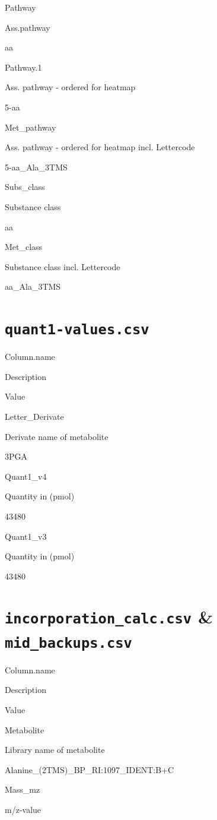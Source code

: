 \documentclass[]{book}
\theoremstyle{definition}
\theoremstyle{definition}
\theoremstyle{definition}
\theoremstyle{remark}
\begin{document}
Pathway

Ass.pathway

aa

Pathway.1

Ass. pathway - ordered for heatmap

5-aa

Met\_pathway

Ass. pathway - ordered for heatmap incl. Lettercode

5-aa\_Ala\_3TMS

Subs\_class

Substance class

aa

Met\_class

Substance class incl. Lettercode

aa\_Ala\_3TMS

\section{\texorpdfstring{\texttt{quant1-values.csv}}{quant1-values.csv}}\label{quant1-values.csv}

Column.name

Description

Value

Letter\_Derivate

Derivate name of metabolite

3PGA

Quant1\_v4

Quantity in (pmol)

43480

Quant1\_v3

Quantity in (pmol)

43480

\section{\texorpdfstring{\texttt{incorporation\_calc.csv} \&
\texttt{mid\_backups.csv}}{incorporation\_calc.csv \& mid\_backups.csv}}\label{incorporation_calc.csv-mid_backups.csv}

Column.name

Description

Value

Metabolite

Library name of metabolite

Alanine\_(2TMS)\_BP\_RI:1097\_IDENT:B+C

Mass\_mz

m/z-value
\end{document}
